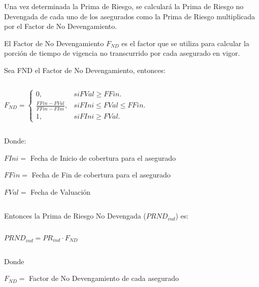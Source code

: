 \documentclass[11pt,twoside,openright,spanish]{report}
\numberwithin{equation}{chapter}
\numberwithin{figure}{chapter}
\numberwithin{table}{chapter}
\begin{document}
	Una vez determinada la Prima de Riesgo, se calculará la Prima de Riesgo no Devengada de cada uno de los asegurados como la Prima de Riesgo multiplicada por el Factor de No Devengamiento.
	
	 
	
	El Factor de No Devengamiento $F_{ND}$ es el factor que se utiliza para calcular la porción de tiempo de vigencia no transcurrido por cada asegurado en vigor.
	
	 
	
	Sea FND el Factor de No Devengamiento, entonces:
	
	 

$ $

 
	
		{\centering	
		
		$
		F_{ND}=\begin{cases}
		0, & \text{$si FVal \geqslant FFin$}.\\
		\frac{{FFin}^{}-{FVal}^{}}{{FFin}^{}-{FIni}^{}}, & \text{$si FIni \leqslant FVal \leqslant FFin$}.\\
		1, & \text{$si FIni \geqslant FVal$}.
		\end{cases}
		$
		
		\noindent
		
	}
	
	 

$ $

 
	
	Donde:
	
	 
	
	 $FIni=$ Fecha de Inicio de cobertura para el asegurado
	
	$FFin=$ Fecha de Fin de cobertura para el asegurado
	
	$FVal=$ Fecha de Valuación
	
	
	 

$ $

 
	
	Entonces la Prima de Riesgo No Devengada ($PRND_{ind}$) es:
	
	 

$ $

 
	
		{\centering
		${PRND}_{ind}^{}={{PR}_{ind}\cdot F_{ND}}$
		\noindent
		
	}	
	
	 

$ $

 
	
	Donde
	
	 
	
	 $F_{ND}=$ Factor de No Devengamiento de cada asegurado
	
\end{document}
